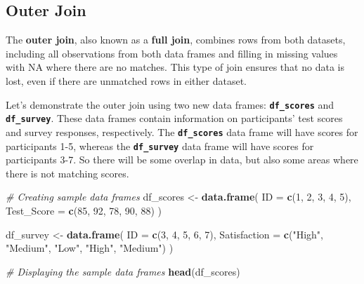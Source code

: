 \documentclass[
]{book}
\newenvironment{Shaded}{\begin{snugshade}}{\end{snugshade}}
\newcommand{\AttributeTok}[1]{\textcolor[rgb]{0.13,0.29,0.53}{#1}}
\newcommand{\CommentTok}[1]{\textcolor[rgb]{0.56,0.35,0.01}{\textit{#1}}}
\newcommand{\DecValTok}[1]{\textcolor[rgb]{0.00,0.00,0.81}{#1}}
\newcommand{\FunctionTok}[1]{\textcolor[rgb]{0.13,0.29,0.53}{\textbf{#1}}}
\newcommand{\NormalTok}[1]{#1}
\newcommand{\OtherTok}[1]{\textcolor[rgb]{0.56,0.35,0.01}{#1}}
\newcommand{\StringTok}[1]{\textcolor[rgb]{0.31,0.60,0.02}{#1}}
\begin{document}
\hypertarget{outer-join}{%
\subsection{Outer Join}\label{outer-join}}

The \textbf{outer join}, also known as a \textbf{full join}, combines rows from both datasets, including all observations from both data frames and filling in missing values with NA where there are no matches. This type of join ensures that no data is lost, even if there are unmatched rows in either dataset.

Let's demonstrate the outer join using two new data frames: \textbf{\texttt{df\_scores}} and \textbf{\texttt{df\_survey}}. These data frames contain information on participants' test scores and survey responses, respectively. The \textbf{\texttt{df\_scores}} data frame will have scores for participants 1-5, whereas the \textbf{\texttt{df\_survey}} data frame will have scores for participants 3-7. So there will be some overlap in data, but also some areas where there is not matching scores.

\begin{Shaded}
\begin{Highlighting}[]
\CommentTok{\# Creating sample data frames}
\NormalTok{df\_scores }\OtherTok{\textless{}{-}} \FunctionTok{data.frame}\NormalTok{(}
  \AttributeTok{ID =} \FunctionTok{c}\NormalTok{(}\DecValTok{1}\NormalTok{, }\DecValTok{2}\NormalTok{, }\DecValTok{3}\NormalTok{, }\DecValTok{4}\NormalTok{, }\DecValTok{5}\NormalTok{),}
  \AttributeTok{Test\_Score =} \FunctionTok{c}\NormalTok{(}\DecValTok{85}\NormalTok{, }\DecValTok{92}\NormalTok{, }\DecValTok{78}\NormalTok{, }\DecValTok{90}\NormalTok{, }\DecValTok{88}\NormalTok{)}
\NormalTok{)}

\NormalTok{df\_survey }\OtherTok{\textless{}{-}} \FunctionTok{data.frame}\NormalTok{(}
  \AttributeTok{ID =} \FunctionTok{c}\NormalTok{(}\DecValTok{3}\NormalTok{, }\DecValTok{4}\NormalTok{, }\DecValTok{5}\NormalTok{, }\DecValTok{6}\NormalTok{, }\DecValTok{7}\NormalTok{),}
  \AttributeTok{Satisfaction =} \FunctionTok{c}\NormalTok{(}\StringTok{"High"}\NormalTok{, }\StringTok{"Medium"}\NormalTok{, }\StringTok{"Low"}\NormalTok{, }\StringTok{"High"}\NormalTok{, }\StringTok{"Medium"}\NormalTok{)}
\NormalTok{)}

\CommentTok{\# Displaying the sample data frames}
\FunctionTok{head}\NormalTok{(df\_scores)}
\end{Highlighting}
\end{Shaded}
\end{document}
